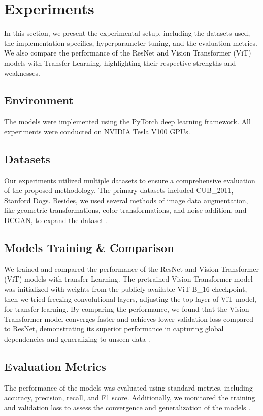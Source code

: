 \section{Experiments}
\label{sec:experiments}

In this section, we present the experimental setup, including the datasets used, the implementation specifics, hyperparameter tuning, and the evaluation metrics. We also compare the performance of the ResNet and Vision Transformer (ViT) models with Transfer Learning, highlighting their respective strengths and weaknesses.

\subsection{Environment}
The models were implemented using the PyTorch deep learning framework. All experiments were conducted on NVIDIA Tesla V100 GPUs.

\subsection{Datasets}
Our experiments utilized multiple datasets to ensure a comprehensive evaluation of the proposed methodology. The primary datasets included CUB\_2011, Stanford Dogs. Besides, we used several methods of image data augmentation, like geometric transformations, color transformations, and noise addition, and DCGAN, to expand the dataset \cite{wah2011caltech,van2018inaturalist}.

\subsection{Models Training \& Comparison}
We trained and compared the performance of the ResNet and Vision Transformer (ViT) models with transfer Learning. The pretrained Vision Transformer model was initialized with weights from the publicly available ViT-B\_16 checkpoint, then we tried freezing convolutional layers, adjusting the top layer of ViT model, for transfer learning. By comparing the performance, we found that the Vision Transformer model converges faster and achieves lower validation loss compared to ResNet, demonstrating its superior performance in capturing global dependencies and generalizing to unseen data \cite{he2016deep,dosovitskiy2021an}.

\subsection{Evaluation Metrics}
The performance of the models was evaluated using standard metrics, including accuracy, precision, recall, and F1 score. Additionally, we monitored the training and validation loss to assess the convergence and generalization of the models \cite{powers2011evaluation}.

